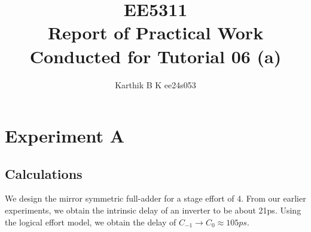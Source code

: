 \documentclass[12pt,a4paper]{article}
\begin{document}
\title{EE5311 \\ Report of Practical Work Conducted for Tutorial 06 (a)}
\author{Karthik B K ee24s053}
\maketitle

\section{Experiment A}
\subsection{Calculations}
\noindent We design the mirror symmetric full-adder for a stage effort of 4. From our earlier experiments, we obtain the intrinsic delay of an inverter to be about 21ps. Using the logical effort model, we obtain the delay of $C_{-1} \rightarrow C_0 \approx 105ps$.
\end{document}
